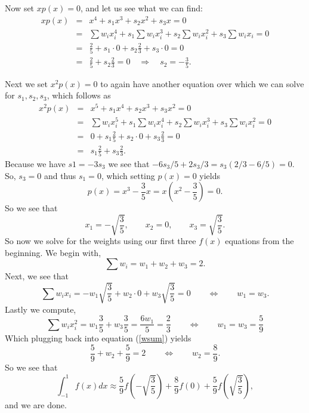 \documentclass[12pt]{amsart}
\begin{document}
\begin{onehalfspace}
        Now set $xp(x) = 0$, and let us see what we can find:
        \begin{eqnarray*}
            xp(x) & = & x^4 + s_1 x^3 + s_2 x^2 + s_3 x = 0 \\
            & = & \sum w_i x_i^4 + s_1 \sum w_i x_i^3 + s_2 \sum w_i x_i^2 + s_3 \sum w_i x_i = 0\\
            & = & \frac{2}{5} + s_1\cdot 0 + s_2 \frac{2}{3} + s_3\cdot 0 = 0\\
            & = & \frac{2}{5} + s_2\frac{2}{3} = 0 \quad\Rightarrow\quad s_2 = -\frac{3}{5}.
        \end{eqnarray*}

        Next we set $x^2 p(x) = 0$ to again have another equation over which we can solve for $s_1, s_2, s_3$, which
        follows as
        \begin{eqnarray*}
            x^2 p(x) & = & x^5 + s_1 x^4 + s_2 x^3 + s_3 x^2 = 0 \\
            & = & \sum w_i x_i^5 + s_1 \sum w_i x_i^4 + s_2 \sum w_i x_i^3 + s_3 \sum w_i x_i^2 = 0\\
            & = & 0 + s_1\frac{2}{5} + s_2\cdot 0 + s_3\frac{2}{3} = 0\\
            & = & s_1\frac{2}{5} + s_3\frac{2}{3}.
        \end{eqnarray*}
        Because we have $s1=-3s_3$ we see that $-6s_3/5 + 2s_3/3 = s_3(2/3-6/5)=0$.
        So, $s_3=0$ and thus $s_1=0$, which setting $p(x)=0$ yields
        \[
            p(x) = x^3 - \frac{3}{5}x = x\left(x^2-\frac{3}{5}\right) = 0.
        \]
        So we see that
        \[
            x_1 = -\sqrt{\frac{3}{5}},\qquad x_2 = 0,\qquad x_3=\sqrt{\frac{3}{5}}.
        \]
        So now we solve for the weights using our first three $f(x)$ equations from the beginning.
        We begin with,
        \begin{equation}
            \sum w_i = w_1 + w_2 + w_3 = 2.
            \label{wsum}
        \end{equation}
        Next, we see that
        \[
            \sum w_i x_i = -w_1\sqrt{\frac{3}{5}} + w_2\cdot 0 + w_3 \sqrt{\frac{3}{5}} = 0 \qquad\Longleftrightarrow\qquad w_1 = w_3.
        \]
        Lastly we compute,
        \[
            \sum w_i x_i^2 = w_1 \frac{3}{5} + w_3\frac{3}{5} = \frac{6 w_1}{5} = \frac{2}{3} \qquad\Longleftrightarrow\qquad w_1=w_3=\frac{5}{9}
        \]
        Which plugging back into equation (\ref{wsum}) yields
        \[
            \frac{5}{9} + w_2 + \frac{5}{9} = 2 \qquad\Longleftrightarrow\qquad w_2 = \frac{8}{9}.
        \]
        So we see that
        \[
            \int_{-1}^1 f(x)dx \approx \frac{5}{9}f\left(-\sqrt{\frac{3}{5}}\right) + \frac{8}{9} f(0) + \frac{5}{9}f\left(\sqrt{\frac{3}{5}}\right),
        \]
        and we are done.


\end{onehalfspace}
\end{document}
